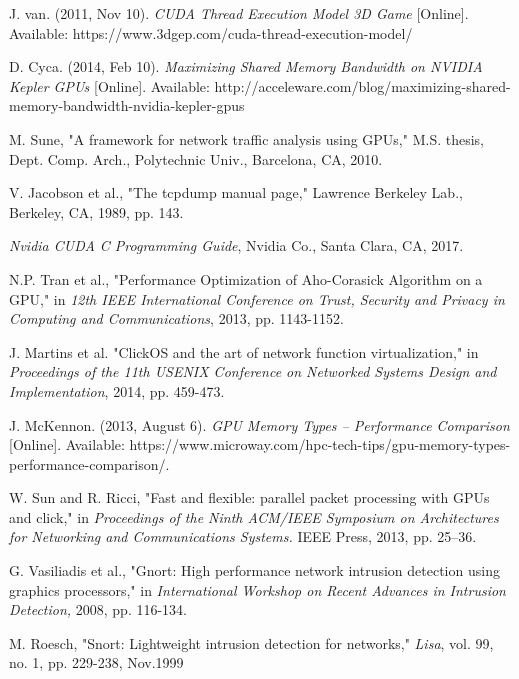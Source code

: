 %
%
%
%
\begin{thebibliography}{10}

J. van. (2011, Nov 10). \textit{CUDA Thread Execution Model 3D Game} [Online]. Available: https://www.3dgep.com/cuda-thread-execution-model/ 

D. Cyca. (2014, Feb 10). \textit{Maximizing Shared Memory Bandwidth on NVIDIA Kepler GPUs} [Online].
Available: http://acceleware.com/blog/maximizing-shared-memory-bandwidth-nvidia-kepler-gpus

M. Sune, "A framework for network traffic analysis
using GPUs," M.S. thesis, Dept. Comp. Arch., Polytechnic Univ., Barcelona, CA, 2010.
 
V. Jacobson et al., "The tcpdump manual page," Lawrence Berkeley Lab., Berkeley, CA, 1989, pp. 143.

 \textit{Nvidia CUDA C Programming Guide}, Nvidia Co., Santa Clara, CA, 2017.

N.P. Tran et al., "Performance Optimization of Aho-Corasick Algorithm on a GPU," in \textit{12th IEEE International Conference on Trust, Security and Privacy in Computing and Communications}, 2013, pp. 1143-1152.

J. Martins et al. "ClickOS and the art of network function virtualization," in \textit{Proceedings of the 11th USENIX Conference on Networked Systems Design and Implementation}, 2014, pp. 459-473. 

 J. McKennon. (2013, August 6). \textit{GPU Memory Types – Performance Comparison} [Online]. Available: https://www.microway.com/hpc-tech-tips/gpu-memory-types-performance-comparison/.

 W. Sun and R. Ricci, "Fast and flexible: parallel packet processing with
GPUs and click," in \textit{Proceedings of the Ninth ACM/IEEE Symposium on
Architectures for Networking and Communications Systems.} IEEE Press,
2013, pp. 25–36.

 G. Vasiliadis et al., "Gnort: High performance network intrusion detection using graphics processors," in \textit{International Workshop on Recent Advances in Intrusion Detection,} 2008, pp. 116-134.
 
 M. Roesch, "Snort: Lightweight intrusion detection for networks," \textit{Lisa}, vol. 99, no. 1, pp. 229-238, Nov.1999 


\end{thebibliography}

